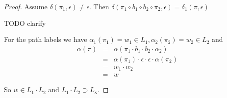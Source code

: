 \begin{proof}
Assume $\delta(\pi_1, \epsilon) \neq \epsilon$. Then $\delta(\pi_1 \circ b_1
\circ b_2 \circ \pi_2, \epsilon) = \delta_1(\pi, \epsilon)$

TODO clarify

For the path labels we have $\alpha_1(\pi_1) = w_1 \in L_1, \alpha_2(\pi_2) =
w_2 \in L_2$ and
\begin{eqnarray*}
\alpha(\pi) &=& \alpha(\pi_1 \cdot b_1 \cdot b_2 \cdot \alpha_2) \\
&=& \alpha(\pi_1) \cdot \epsilon \cdot \epsilon \cdot \alpha(\pi_2) \\
&=& w_1 \cdot w_2 \\
&=& w
\end{eqnarray*}

So $w \in L_1 \cdot L_2$ and $L_1 \cdot L_2 \supset L_{\kappa}$.
\end{proof}

